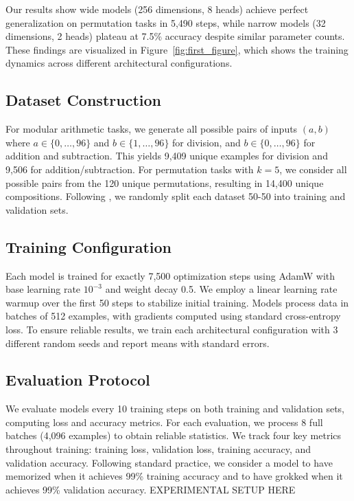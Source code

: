\documentclass{article} %
\begin{document}
Our results show wide models (256 dimensions, 8 heads) achieve perfect generalization on permutation tasks in 5,490 steps, while narrow models (32 dimensions, 2 heads) plateau at 7.5\% accuracy despite similar parameter counts. These findings are visualized in Figure~\ref{fig:first_figure}, which shows the training dynamics across different architectural configurations.
\subsection{Dataset Construction}
For modular arithmetic tasks, we generate all possible pairs of inputs $(a,b)$ where $a \in \{0,\ldots,96\}$ and $b \in \{1,\ldots,96\}$ for division, and $b \in \{0,\ldots,96\}$ for addition and subtraction. This yields 9,409 unique examples for division and 9,506 for addition/subtraction. For permutation tasks with $k=5$, we consider all possible pairs from the 120 unique permutations, resulting in 14,400 unique compositions. Following \citet{power2022grokking}, we randomly split each dataset 50-50 into training and validation sets.

\subsection{Training Configuration}
Each model is trained for exactly 7,500 optimization steps using AdamW with base learning rate $10^{-3}$ and weight decay 0.5. We employ a linear learning rate warmup over the first 50 steps to stabilize initial training. Models process data in batches of 512 examples, with gradients computed using standard cross-entropy loss. To ensure reliable results, we train each architectural configuration with 3 different random seeds and report means with standard errors.

\subsection{Evaluation Protocol}
We evaluate models every 10 training steps on both training and validation sets, computing loss and accuracy metrics. For each evaluation, we process 8 full batches (4,096 examples) to obtain reliable statistics. We track four key metrics throughout training: training loss, validation loss, training accuracy, and validation accuracy. Following standard practice, we consider a model to have memorized when it achieves 99\% training accuracy and to have grokked when it achieves 99\% validation accuracy.
\label{sec:experimental}
EXPERIMENTAL SETUP HERE
\end{document}
